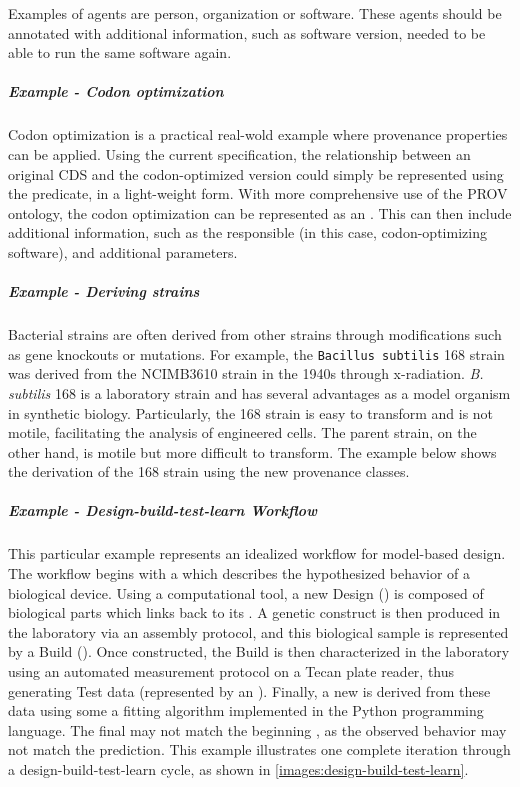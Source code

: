  Examples of agents are person, organization or software. These agents should be annotated with additional information, such as software version, needed to be able to run the same software again.

\subparagraph{Example - Codon optimization}

 Codon optimization is a practical real-wold example where provenance properties can be applied. Using the current specification, the relationship between an original CDS and the codon-optimized version could simply be represented using the  predicate, in a light-weight form. With more comprehensive use of the PROV ontology, the codon optimization can be represented as an . This  can then include additional information, such as the  responsible (in this case, codon-optimizing software), and additional parameters.

\subparagraph{Example - Deriving strains}

Bacterial strains are often derived from other strains through modifications such as gene knockouts or mutations. For example, the \texttt{Bacillus subtilis} 168 strain was derived from the NCIMB3610 strain in the 1940s through x-radiation. \textit{B. subtilis} 168 is a laboratory strain and has several advantages as a model organism in synthetic biology. Particularly, the 168 strain is easy to transform and is not motile, facilitating the analysis of engineered cells. The parent strain, on the other hand, is motile but more difficult to transform. The example below shows the derivation of the 168 strain using the new provenance classes.

\subparagraph{Example - Design-build-test-learn Workflow}

This particular example represents an idealized workflow for model-based design. The workflow begins with a  which describes the hypothesized behavior of a biological device. Using a computational tool, a new Design () is composed of biological parts which links back to its . A genetic construct is then produced in the laboratory via an assembly protocol, and this biological sample is represented by a Build (). Once constructed, the Build is then characterized in the laboratory using an automated measurement protocol on a Tecan plate reader, thus generating Test data (represented by an ). Finally, a new  is derived from these data using some a fitting algorithm implemented in the Python programming language. The final  may not match the beginning , as the observed behavior may not match the prediction. This example illustrates one complete iteration through a design-build-test-learn cycle, as shown in \ref{images:design-build-test-learn}.

